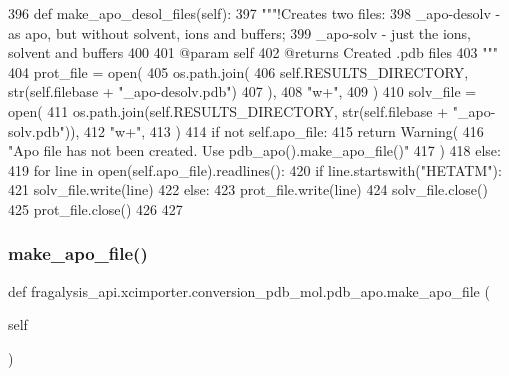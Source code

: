 \begin{DoxyCode}
396     \textcolor{keyword}{def }make\_apo\_desol\_files(self):
397         \textcolor{stringliteral}{"""!Creates two files:}
398 \textcolor{stringliteral}{        \_apo-desolv - as apo, but without solvent, ions and buffers;}
399 \textcolor{stringliteral}{        \_apo-solv - just the ions, solvent and buffers}
400 \textcolor{stringliteral}{}
401 \textcolor{stringliteral}{        @param self}
402 \textcolor{stringliteral}{        @returns Created .pdb files}
403 \textcolor{stringliteral}{        """}
404         prot\_file = open(
405             os.path.join(
406                 self.RESULTS\_DIRECTORY, str(self.filebase + \textcolor{stringliteral}{"\_apo-desolv.pdb"})
407             ),
408             \textcolor{stringliteral}{"w+"},
409         )
410         solv\_file = open(
411             os.path.join(self.RESULTS\_DIRECTORY, str(self.filebase + \textcolor{stringliteral}{"\_apo-solv.pdb"})),
412             \textcolor{stringliteral}{"w+"},
413         )
414         \textcolor{keywordflow}{if} \textcolor{keywordflow}{not} self.apo\_file:
415             \textcolor{keywordflow}{return} Warning(
416                 \textcolor{stringliteral}{"Apo file has not been created. Use pdb\_apo().make\_apo\_file()"}
417             )
418         \textcolor{keywordflow}{else}:
419             \textcolor{keywordflow}{for} line \textcolor{keywordflow}{in} open(self.apo\_file).readlines():
420                 \textcolor{keywordflow}{if} line.startswith(\textcolor{stringliteral}{"HETATM"}):
421                     solv\_file.write(line)
422                 \textcolor{keywordflow}{else}:
423                     prot\_file.write(line)
424         solv\_file.close()
425         prot\_file.close()
426 
427 
\end{DoxyCode}
\mbox{\label{classfragalysis__api_1_1xcimporter_1_1conversion__pdb__mol_1_1pdb__apo_a08488b34eeb131d43d3139ecbbdb78fb}} 
\subsubsection{\texorpdfstring{make\+\_\+apo\+\_\+file()}{make\_apo\_file()}}
{\footnotesize\ttfamily def fragalysis\+\_\+api.\+xcimporter.\+conversion\+\_\+pdb\+\_\+mol.\+pdb\+\_\+apo.\+make\+\_\+apo\+\_\+file (\begin{DoxyParamCaption}\item[{}]{self }\end{DoxyParamCaption})}



